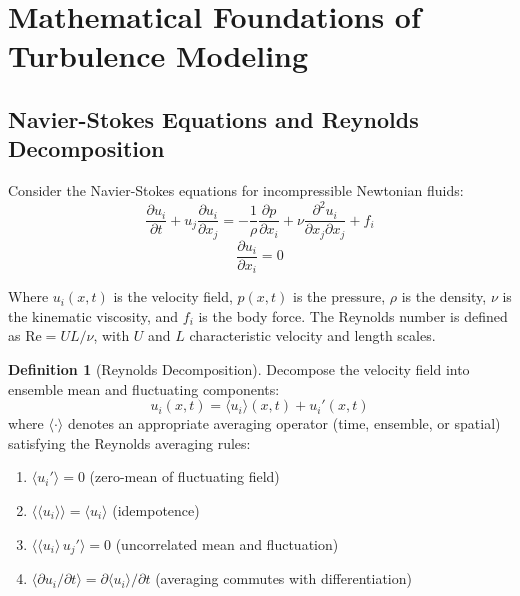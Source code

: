 \documentclass[12pt,a4paper]{article}
\theoremstyle{plain}
\theoremstyle{definition}
\newtheorem{definition}[theorem]{Definition}
\theoremstyle{remark}
\newcommand{\ReNum}{\mathrm{Re}}
\newcommand{\pdiff}{\partial}
\newcommand{\avg}[1]{\langle #1 \rangle}
\begin{document}
\section{Mathematical Foundations of Turbulence Modeling}

\subsection{Navier-Stokes Equations and Reynolds Decomposition}

Consider the Navier-Stokes equations for incompressible Newtonian fluids:
\begin{equation}
\frac{\pdiff u_i}{\pdiff t} + u_j \frac{\pdiff u_i}{\pdiff x_j} = -\frac{1}{\rho}\frac{\pdiff p}{\pdiff x_i} + \nu \frac{\pdiff^2 u_i}{\pdiff x_j \pdiff x_j} + f_i
\label{eq:ns}
\end{equation}
\begin{equation}
\frac{\pdiff u_i}{\pdiff x_i} = 0
\label{eq:continuity}
\end{equation}

Where $u_i(x,t)$ is the velocity field, $p(x,t)$ is the pressure, $\rho$ is the density, $\nu$ is the kinematic viscosity, and $f_i$ is the body force. The Reynolds number is defined as $\ReNum = UL/\nu$, with $U$ and $L$ characteristic velocity and length scales.

\begin{definition}[Reynolds Decomposition]
Decompose the velocity field into ensemble mean and fluctuating components:
\begin{equation}
u_i(x,t) = \avg{u_i}(x,t) + u_i'(x,t)
\end{equation}
where $\avg{\cdot}$ denotes an appropriate averaging operator (time, ensemble, or spatial) satisfying the Reynolds averaging rules:
\begin{enumerate}[label=(\roman*)]
    \item $\avg{u_i'} = 0$ (zero-mean of fluctuating field)
    \item $\avg{\avg{u_i}} = \avg{u_i}$ (idempotence)
    \item $\avg{\avg{u_i}\, u_j'} = 0$ (uncorrelated mean and fluctuation)
    \item $\avg{\pdiff u_i/\pdiff t} = \pdiff\avg{u_i}/\pdiff t$ (averaging commutes with differentiation)
\end{enumerate}
\end{definition}
\end{document}
